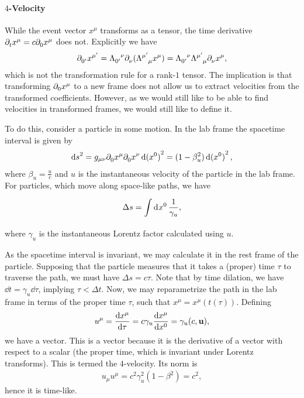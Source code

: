 \paragraph{$4$-Velocity}
While the event vector $x^{\mu}$ transforms as a tensor, the time derivative $\partial^{}_{t}x^{\mu} = c\partial^{}_{0}x^{\mu}$ does not. Explicitly we have
\begin{align*}
	\del{0\p}{x^{\mu\p}} = \trcod{0\p}{\nu}\del{\nu}{(\trcou{\mu\p}{\mu}x^{\mu})} = \trcod{0\p}{\nu}\trcou{\mu\p}{\mu}\del{\nu}{x^{\mu}},
\end{align*}
which is not the transformation rule for a rank-$1$ tensor. The implication is that transforming $\partial^{}_{0}x^{\mu}$ to a new frame does not allow us to extract velocities from the transformed coefficients. However, as we would still like to be able to find velocities in transformed frames, we would still like to define it.

To do this, consider a particle in some motion. In the lab frame the spacetime interval is given by
\begin{align*}
	\dd{s}^{2} = g_{\mu\nu}\partial^{}_{0}x^{\mu}\partial^{}_{0}x^{\nu}\dd{(x^{0})}^{2} = (1 - \beta_{u}^{2})\dd{(x^{0})}^{2},
\end{align*}
where $\beta_{u} = \frac{u}{c}$ and $u$ is the instantaneous velocity of the particle in the lab frame. For particles, which move along space-like paths, we have
\begin{align*}
	\Delta s = \int\limits_{}^{}\dd[]{x^{0}}\frac{1}{\gamma_{u}},
\end{align*}
where $\gamma_{u}$ is the instantaneous Lorentz factor calculated using $u$.

As the spacetime interval is invariant, we may calculate it in the rest frame of the particle. Supposing that the particle measures that it takes a (proper) time $\tau$ to traverse the path, we must have $\Delta s = c\tau$. Note that by time dilation, we have $\dd{t} = \gamma_{u}\dd{\tau}$, implying $\tau < \Delta t$. Now, we may reparametrize the path in the lab frame in terms of the proper time $\tau$, such that $x^{\mu} = x^{\mu}(t(\tau))$. Defining
\begin{align*}
	u^{\mu} = \dv{x^{\mu}}{\tau} = c\gamma_{u}\dv{x^{\mu}}{x^{0}} = \gamma_{u}(c, \vb{u}),
\end{align*}
we have a vector. This is a vector because it is the derivative of a vector with respect to a scalar (the proper time, which is invariant under Lorentz transforms). This is termed the $4$-velocity. Its norm is
\begin{align*}
	u_{\mu}u^{\mu} = c^{2}\gamma_{u}^{2}(1 - \beta^{2}) = c^{2},
\end{align*}
hence it is time-like.

